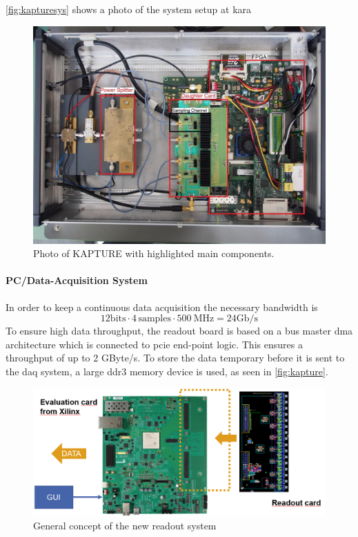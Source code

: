 \autoref{fig:kapturesys} shows a photo of the system setup at \gls{kara}
\begin{figure}[tbh]
	\centering
	\includegraphics[width = \textwidth]{chap/03-currentStat/img/kapture_sys}
	\caption[Photo of KAPTURE system]{Photo of KAPTURE with highlighted main components. \cite[p.~61]{brosi}}
	\label{fig:kapturesys}
\end{figure}

\paragraph{PC/Data-Acquisition System}
In order to keep a continuous data acquisition the necessary bandwidth is 
\begin{equation}
	12 \text{bits} \cdot 4 \, \text{samples} \cdot \SI{500}{\mega \hertz} = 24 \text{Gb/s}
\end{equation}
To ensure high data throughput, the readout board is based on a bus master \gls{dma} architecture which is connected to \gls{pcie} end-point logic. This ensures a throughput of up to 2 GByte/s. To store the data temporary before it is sent to the \gls{daq} system, a large \gls{ddr}3 memory device is used, as seen in \autoref{fig:kapture}. \cite{caselleKAP}
\begin{figure}[tbh]
	\centering
	\includegraphics[width = \textwidth]{chap/04-work/img/concept_theresa}
	\caption{General concept of the new readout system}
	\label{fig:concept_theresa}
\end{figure}

